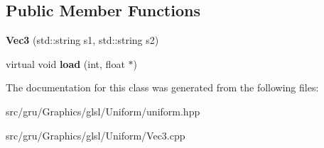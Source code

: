 \subsection*{\-Public \-Member \-Functions}
\begin{DoxyCompactItemize}
\item 
\hypertarget{classglutpp_1_1glsl_1_1Uniform_1_1Vector_1_1Vec3_af84b304861227b1b4a82e4a81828e4fe}{{\bfseries \-Vec3} (std\-::string s1, std\-::string s2)}\label{classglutpp_1_1glsl_1_1Uniform_1_1Vector_1_1Vec3_af84b304861227b1b4a82e4a81828e4fe}

\item 
\hypertarget{classglutpp_1_1glsl_1_1Uniform_1_1Vector_1_1Vec3_a8ff99402b1b976def5bcacc4e012e5c1}{virtual void {\bfseries load} (int, float $\ast$)}\label{classglutpp_1_1glsl_1_1Uniform_1_1Vector_1_1Vec3_a8ff99402b1b976def5bcacc4e012e5c1}

\end{DoxyCompactItemize}


\-The documentation for this class was generated from the following files\-:\begin{DoxyCompactItemize}
\item 
src/gru/\-Graphics/glsl/\-Uniform/uniform.\-hpp\item 
src/gru/\-Graphics/glsl/\-Uniform/\-Vec3.\-cpp\end{DoxyCompactItemize}
